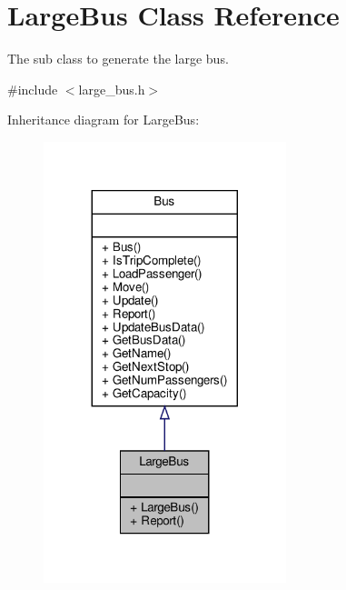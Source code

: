 \hypertarget{classLargeBus}{}\section{Large\+Bus Class Reference}
\label{classLargeBus}


The sub class to generate the large bus.  




{\ttfamily \#include $<$large\+\_\+bus.\+h$>$}



Inheritance diagram for Large\+Bus\+:\nopagebreak
\begin{figure}[H]
\begin{center}
\leavevmode
\includegraphics[width=200pt]{classLargeBus__inherit__graph}
\end{center}
\end{figure}



